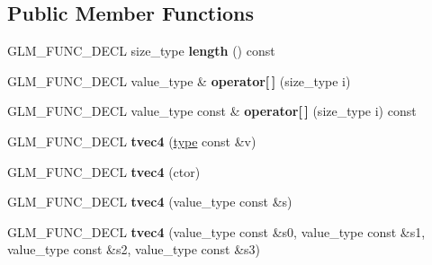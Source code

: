 \subsection*{\-Public \-Member \-Functions}
\begin{DoxyCompactItemize}
\item 
\hypertarget{structglm_1_1detail_1_1tvec4_abf7879a66d8c8e3bb413216055568c5a}{\-G\-L\-M\-\_\-\-F\-U\-N\-C\-\_\-\-D\-E\-C\-L size\-\_\-type {\bfseries length} () const }\label{structglm_1_1detail_1_1tvec4_abf7879a66d8c8e3bb413216055568c5a}

\item 
\hypertarget{structglm_1_1detail_1_1tvec4_a36ddbd2ee45cd2eba80e479c349c4c21}{\-G\-L\-M\-\_\-\-F\-U\-N\-C\-\_\-\-D\-E\-C\-L value\-\_\-type \& {\bfseries operator\mbox{[}$\,$\mbox{]}} (size\-\_\-type i)}\label{structglm_1_1detail_1_1tvec4_a36ddbd2ee45cd2eba80e479c349c4c21}

\item 
\hypertarget{structglm_1_1detail_1_1tvec4_a3dbc4e601a499b4317f9fdbd98c6316e}{\-G\-L\-M\-\_\-\-F\-U\-N\-C\-\_\-\-D\-E\-C\-L value\-\_\-type const \& {\bfseries operator\mbox{[}$\,$\mbox{]}} (size\-\_\-type i) const }\label{structglm_1_1detail_1_1tvec4_a3dbc4e601a499b4317f9fdbd98c6316e}

\item 
\hypertarget{structglm_1_1detail_1_1tvec4_a4bdded9554fe40d756d1053f34d0630f}{\-G\-L\-M\-\_\-\-F\-U\-N\-C\-\_\-\-D\-E\-C\-L {\bfseries tvec4} (\hyperlink{structglm_1_1detail_1_1tvec4}{type} const \&v)}\label{structglm_1_1detail_1_1tvec4_a4bdded9554fe40d756d1053f34d0630f}

\item 
\hypertarget{structglm_1_1detail_1_1tvec4_a41263083d8c13d7a5ac082662e362e39}{\-G\-L\-M\-\_\-\-F\-U\-N\-C\-\_\-\-D\-E\-C\-L {\bfseries tvec4} (ctor)}\label{structglm_1_1detail_1_1tvec4_a41263083d8c13d7a5ac082662e362e39}

\item 
\hypertarget{structglm_1_1detail_1_1tvec4_a3b0f7edb1ddfd5cbf098d66b2ffe3607}{\-G\-L\-M\-\_\-\-F\-U\-N\-C\-\_\-\-D\-E\-C\-L {\bfseries tvec4} (value\-\_\-type const \&s)}\label{structglm_1_1detail_1_1tvec4_a3b0f7edb1ddfd5cbf098d66b2ffe3607}

\item 
\hypertarget{structglm_1_1detail_1_1tvec4_ad982f73c86d64540e263102067828e0e}{\-G\-L\-M\-\_\-\-F\-U\-N\-C\-\_\-\-D\-E\-C\-L {\bfseries tvec4} (value\-\_\-type const \&s0, value\-\_\-type const \&s1, value\-\_\-type const \&s2, value\-\_\-type const \&s3)}\label{structglm_1_1detail_1_1tvec4_ad982f73c86d64540e263102067828e0e}


\end{DoxyCompactItemize}
